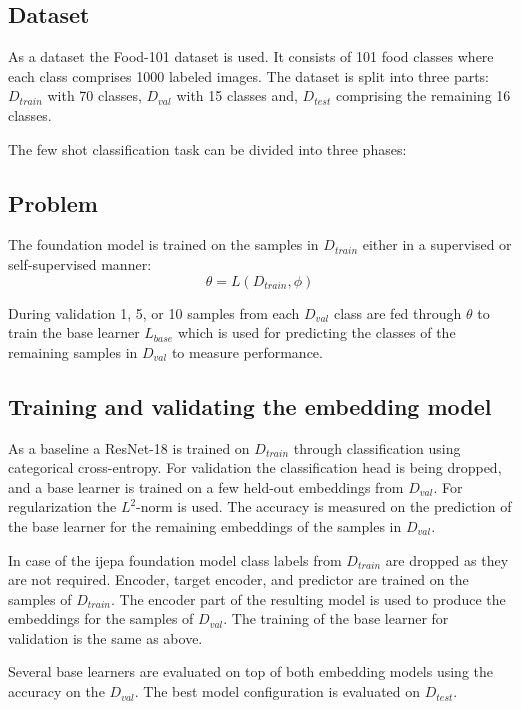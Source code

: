 \subsection{Dataset}
As a dataset the Food-101 dataset \cite{fleet_food-101_2014} is used. It consists of 101 food classes where 
each class comprises 1000 labeled images. The dataset is split into three parts: $D_{train}$ with 70 classes,
$D_{val}$ with 15 classes and, $D_{test}$ comprising the remaining 16 classes.

The few shot classification task can be divided into three phases:

\subsection{Problem}
The foundation model is trained on the samples in $D_{train}$ either in a supervised or self-supervised manner:
\begin{equation}
	\theta = L(D_{train}, \phi)
\end{equation}

During validation 1, 5, or 10 samples from each $D_{val}$ class are fed through $\theta$ to train the 
base learner $L_{base}$ which is used for predicting the classes of the remaining samples in $D_{val}$ 
to measure performance.

\subsection{Training and validating the embedding model}
As a baseline a ResNet-18 is trained on $D_{train}$ through classification using 
categorical cross-entropy. For validation the classification 
head is being dropped, and a base learner is trained on a few held-out embeddings from $D_{val}$. 
For regularization the $L^2$-norm is used. The accuracy is 
measured on the prediction of the base learner for the remaining embeddings of the samples in $D_{val}$.

In case of the \gls{ijepa} foundation model class labels from $D_{train}$ are dropped as they are not required. 
Encoder, target encoder, and predictor are trained on the samples of $D_{train}$. The encoder part of the resulting 
model is used to produce the embeddings for the samples of $D_{val}$. 
The training of the base learner for validation is the same as above.

Several base learners are evaluated on top of both embedding models using the accuracy on the $D_{val}$. The best
model configuration is evaluated on $D_{test}$.
